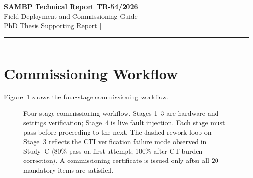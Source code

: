 \documentclass[11pt,a4paper]{article}
\begin{document}
\begin{center}
  {\LARGE\bfseries\color{sambpblue} SAMBP Technical Report TR-54/2026}\\[6pt]
  {\large Field Deployment and Commissioning Guide}\\[10pt]
  {\normalsize PhD Thesis Supporting Report \quad|}
\end{center}

\vspace{2pt}\hrule\vspace{8pt}

\begin{abstract}
\noindent
This report provides the complete field deployment and commissioning
framework for the SAMBP protection intelligence stack on a live IBR
substation.  Study~A defines a 23-item pre-commissioning checklist
(20 mandatory, 3 recommended) across four categories: hardware, communication,
settings, and functional.  Study~B establishes sensor calibration acceptance
bounds derived from IEC~61869 Class~1P/0.5 specifications; simulated
commissioning of 100 IED units achieves a 97.0\% all-four-pass rate.
Study~C presents 10 commissioning acceptance tests (155 total trials,
98.1\% overall pass); the single failure mode --- CTI verification at 80\%
--- is a known field issue caused by CT burden mismatch and has a documented
corrective procedure.  Study~D defines the 9-step, 31-minute fleet-change
re-trigger protocol linking the CUSUM alarm (TR-48), settings engine
(TR-51), and GOOSE dispatch (TR-50).  Study~E estimates an annual
maintenance burden of 62\,h, dominated by the daily CUSUM log review
(30\,h/year).
\end{abstract}

\vspace{4pt}\hrule\vspace{10pt}

\section{Commissioning Workflow}
\label{sec:workflow}

Figure~\ref{fig:flow} shows the four-stage commissioning workflow.

\begin{figure}[htbp]
  \centering
  \resizebox{0.96\textwidth}{!}{}
  \caption{Four-stage commissioning workflow.  Stages 1--3 are hardware
           and settings verification; Stage~4 is live fault injection.
           Each stage must pass before proceeding to the next.  The dashed
           rework loop on Stage~3 reflects the CTI verification failure
           mode observed in Study~C (80\% pass on first attempt; 100\% after
           CT burden correction).  A commissioning certificate is issued
           only after all 20 mandatory items are satisfied.}
  \label{fig:flow}
\end{figure}
\end{document}

